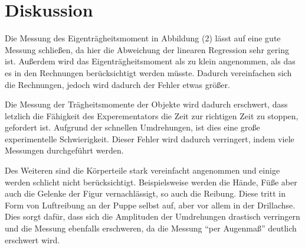 \section{Diskussion}
\label{sec:Diskussion}

Die Messung des Eigenträgheitsmoment in Abbildung (2) lässt auf eine gute Messung schließen,
da hier die Abweichung der linearen Regression sehr gering ist.
Außerdem wird das Eigenträgheitsmoment als zu klein angenommen, als das es in den Rechnungen berücksichtigt werden müsste.
Dadurch vereinfachen sich die Rechnungen, jedoch wird dadurch der Fehler etwas größer.

Die Messung der Trägheitsmomente der Objekte wird dadurch erschwert, dass letzlich die Fähigkeit des Experementators die Zeit zur 
richtigen Zeit zu stoppen, gefordert ist.
Aufgrund der schnellen Umdrehungen, ist dies eine große experimentelle Schwierigkeit.
Dieser Fehler wird dadurch verringert, indem viele Messungen durchgeführt werden.

Des Weiteren sind die Körperteile stark vereinfacht angenommen und einige werden schlicht nicht berücksichtigt.
Beispielsweise werden die Hände, Füße aber auch die Gelenke der Figur vernachlässigt, so auch die Reibung.
Diese tritt in Form von Luftreibung an der Puppe selbst auf, aber vor allem in der Drillachse.
Dies sorgt dafür, dass sich die Amplituden der Umdrehungen drastisch verringern und die Messung ebenfalls erschweren, da die
Messung \enquote{per Augenmaß} deutlich erschwert wird.

\nocite{matplotlib}
\nocite{numpy}